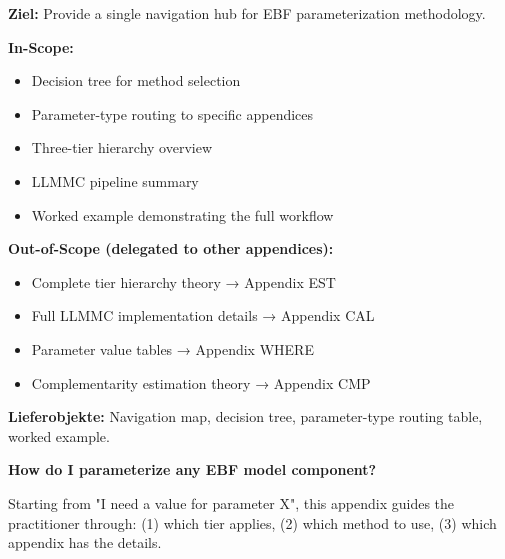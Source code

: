 \begin{tcolorbox}[colback=gray!5!white, colframe=gray!75!black, title=Appendix Scope:]
\textbf{Ziel:} Provide a single navigation hub for EBF parameterization methodology.

\textbf{In-Scope:}
\begin{itemize}[nosep]
    \item Decision tree for method selection
    \item Parameter-type routing to specific appendices
    \item Three-tier hierarchy overview
    \item LLMMC pipeline summary
    \item Worked example demonstrating the full workflow
\end{itemize}

\textbf{Out-of-Scope (delegated to other appendices):}
\begin{itemize}[nosep]
    \item Complete tier hierarchy theory → Appendix EST
    \item Full LLMMC implementation details → Appendix CAL
    \item Parameter value tables → Appendix WHERE
    \item Complementarity estimation theory → Appendix CMP
\end{itemize}

\textbf{Lieferobjekte:} Navigation map, decision tree, parameter-type routing table, worked example.
\end{tcolorbox}


\begin{tcolorbox}[colback=orange!5!white, colframe=orange!75!black, title=Fundamental Question]
\textbf{How do I parameterize any EBF model component?}

Starting from "I need a value for parameter X", this appendix guides the practitioner through:
(1) which tier applies, (2) which method to use, (3) which appendix has the details.
\end{tcolorbox}



